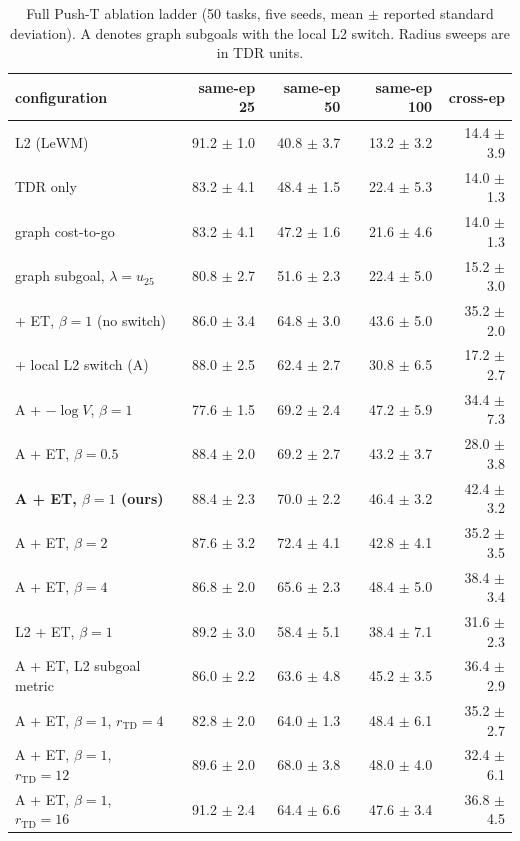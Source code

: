 \documentclass{article}
\theoremstyle{definition}
\theoremstyle{remark}
\begin{document}
\begin{table}[h]
\centering\small\setlength{\tabcolsep}{3pt}
\caption{Full Push-T ablation ladder (50 tasks, five seeds, mean $\pm$ reported standard deviation). A denotes graph subgoals with the local L2 switch. Radius sweeps are in TDR units.}
\label{tab:ladder}
\begin{tabular}{lrrrr}
\toprule
configuration & same-ep 25 & same-ep 50 & same-ep 100 & cross-ep \\
\midrule
L2 (LeWM) & 91.2 $\pm$ 1.0 & 40.8 $\pm$ 3.7 & 13.2 $\pm$ 3.2 & 14.4 $\pm$ 3.9 \\
TDR only & 83.2 $\pm$ 4.1 & 48.4 $\pm$ 1.5 & 22.4 $\pm$ 5.3 & 14.0 $\pm$ 1.3 \\
graph cost-to-go & 83.2 $\pm$ 4.1 & 47.2 $\pm$ 1.6 & 21.6 $\pm$ 4.6 & 14.0 $\pm$ 1.3 \\
graph subgoal, $\lambda=u_{25}$ & 80.8 $\pm$ 2.7 & 51.6 $\pm$ 2.3 & 22.4 $\pm$ 5.0 & 15.2 $\pm$ 3.0 \\
\quad + ET, $\beta=1$ (no switch) & 86.0 $\pm$ 3.4 & 64.8 $\pm$ 3.0 & 43.6 $\pm$ 5.0 & 35.2 $\pm$ 2.0 \\
\quad + local L2 switch (A) & 88.0 $\pm$ 2.5 & 62.4 $\pm$ 2.7 & 30.8 $\pm$ 6.5 & 17.2 $\pm$ 2.7 \\
\midrule
A + $-\log V$, $\beta=1$ & 77.6 $\pm$ 1.5 & 69.2 $\pm$ 2.4 & 47.2 $\pm$ 5.9 & 34.4 $\pm$ 7.3 \\
\midrule
A + ET, $\beta=0.5$ & 88.4 $\pm$ 2.0 & 69.2 $\pm$ 2.7 & 43.2 $\pm$ 3.7 & 28.0 $\pm$ 3.8 \\
\textbf{A + ET, $\beta=1$ (ours)} & 88.4 $\pm$ 2.3 & 70.0 $\pm$ 2.2 & 46.4 $\pm$ 3.2 & 42.4 $\pm$ 3.2 \\
A + ET, $\beta=2$ & 87.6 $\pm$ 3.2 & 72.4 $\pm$ 4.1 & 42.8 $\pm$ 4.1 & 35.2 $\pm$ 3.5 \\
A + ET, $\beta=4$ & 86.8 $\pm$ 2.0 & 65.6 $\pm$ 2.3 & 48.4 $\pm$ 5.0 & 38.4 $\pm$ 3.4 \\
\midrule
L2 + ET, $\beta=1$ & 89.2 $\pm$ 3.0 & 58.4 $\pm$ 5.1 & 38.4 $\pm$ 7.1 & 31.6 $\pm$ 2.3 \\
A + ET, L2 subgoal metric & 86.0 $\pm$ 2.2 & 63.6 $\pm$ 4.8 & 45.2 $\pm$ 3.5 & 36.4 $\pm$ 2.9 \\
\midrule
A + ET, $\beta=1$, $r_{\mathrm{TD}}=4$ & 82.8 $\pm$ 2.0 & 64.0 $\pm$ 1.3 & 48.4 $\pm$ 6.1 & 35.2 $\pm$ 2.7 \\
A + ET, $\beta=1$, $r_{\mathrm{TD}}=12$ & 89.6 $\pm$ 2.0 & 68.0 $\pm$ 3.8 & 48.0 $\pm$ 4.0 & 32.4 $\pm$ 6.1 \\
A + ET, $\beta=1$, $r_{\mathrm{TD}}=16$ & 91.2 $\pm$ 2.4 & 64.4 $\pm$ 6.6 & 47.6 $\pm$ 3.4 & 36.8 $\pm$ 4.5 \\
\bottomrule
\end{tabular}
\end{table}
\end{document}
